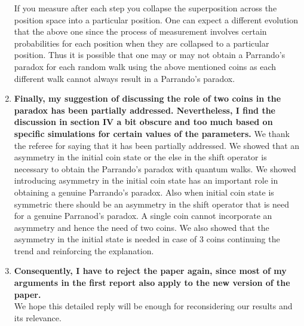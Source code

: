 \documentclass[12pt]{article}
\begin{document}
\begin{enumerate}
If you measure after each step you collapse the superposition across the position space into a particular position. One can expect a different evolution that the above one since the process of measurement involves certain probabilities for each position when they are collapsed to a particular position. Thus it is possible that one may or may not obtain a Parrando's paradox for each random walk using the above mentioned coins as each different walk cannot always result in a Parrando's paradox.
\item \textbf{Finally, my suggestion of discussing the role of two coins in the
paradox has been partially addressed. Nevertheless, I find the
discussion in section IV a bit obscure and too much based on specific
simulations for certain values of the parameters.}
We thank the referee for saying that it has been partially addressed. We showed that an asymmetry in the initial coin state or the else in the shift operator is necessary to obtain the Parrando's paradox with quantum walks. We showed  introducing asymmetry in the initial coin state has an important role in obtaining a genuine Parrando's paradox. Also when initial coin state is symmetric there should be an asymmetry in the shift operator that is need for a genuine Parranod's paradox. A single coin cannot incorporate an asymmetry and hence the need of two coins. We also showed that the asymmetry in the initial state is needed in case of 3 coins continuing the trend and reinforcing the explanation.

\item \textbf{Consequently, I have to reject the paper again, since most of my
arguments in the first report also apply to the new version of the
paper.}\\
We hope this detailed reply will be enough for reconsidering our results and its relevance.
\end{enumerate}

\end{document}
